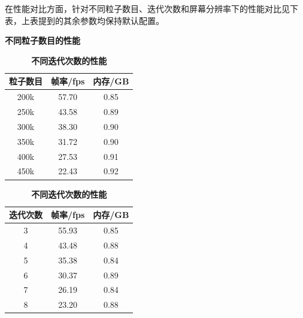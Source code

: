 在性能对比方面，针对不同粒子数目、迭代次数和屏幕分辨率下的性能对比见下表，上表提到的其余参数均保持默认配置。
\begin{table}[H]
    \centering
    \begin{minipage}{0.5\textwidth}
        \caption{\textbf{不同粒子数目的性能}}
        \label{tab:particleCount}
        \centering
        \begin{tabular}{ccc}
            \toprule
            粒子数目 & 帧率/fps & 内存/GB \\
            \midrule
            200k & 57.70 & 0.85 \\
            250k & 43.58 & 0.89 \\
            300k & 38.30 & 0.90 \\
            350k & 31.72 & 0.90 \\
            400k & 27.53 & 0.91 \\
            450k & 22.43 & 0.92 \\
            \bottomrule
        \end{tabular}
    \end{minipage}\hfill
    \begin{minipage}{0.5\textwidth}
        \caption{\textbf{不同迭代次数的性能}}
        \label{tab:iterationCount}
        \centering
        \begin{tabular}{ccc}
            \toprule
            迭代次数 & 帧率/fps & 内存/GB \\
            \midrule
            3 & 55.93 & 0.85 \\
            4 & 43.48 & 0.88 \\
            5 & 35.38 & 0.84 \\
            6 & 30.37 & 0.89 \\
            7 & 26.19 & 0.84 \\
            8 & 23.20 & 0.88 \\
            \bottomrule
        \end{tabular}
    \end{minipage}
\end{table}
